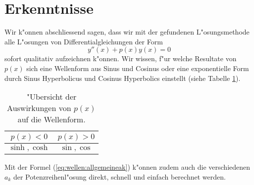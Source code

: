 \section{Erkenntnisse}
Wir k"onnen abschliessend sagen, dass wir mit der gefundenen L"osungsmethode 
alle L"osungen von Differentialgleichungen der Form 
\begin{equation*}
	y''(x)+p(x)y(x) = 0
\end{equation*}
sofort qualitativ aufzeichnen k"onnen.
%
Wir wissen, f"ur welche Resultate von 
$p(x)$ sich eine Wellenform aus Sinus und Cosinus oder eine exponentielle Form 
durch Sinus Hyperbolicus und Cosinus Hyperbolics einstellt (siehe Tabelle 
\ref{tab:wellen:formoverview}).
\begin{table}
	\centering
	\begin{tabular}{ c | c }
		$p(x) < 0$ & $p(x) > 0$ \\\hline
		$\sinh, \cosh$ & $\sin, \cos$
	\end{tabular}
	\caption{"Ubersicht der Auswirkungen von $p(x)$ auf die Wellenform.}
	\label{tab:wellen:formoverview}
\end{table}
Mit der Formel (\ref{eq:wellen:allgemeineak}) k"onnen zudem auch die 
verschiedenen $a_k$ der Potenzreihenl"osung direkt, schnell und einfach 
berechnet werden.
